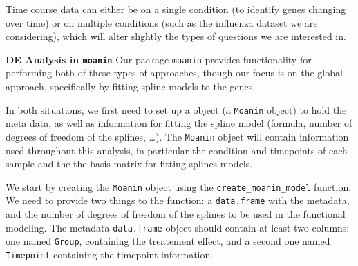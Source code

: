 \documentclass[9pt,a4paper,]{extarticle}
\begin{document}
Time course data can either be on a single condition (to identify genes
changing over time) or on multiple conditions (such as the influenza
dataset we are considering), which will alter slightly the types of questions
we are interested in.

\textbf{DE Analysis in \texttt{moanin}} Our package \texttt{moanin} provides functionality for performing both of
these types of approaches, though our focus is on the global approach, specifically by fitting spline models to the genes.

In both
situations, we first need to set up a object (a \texttt{Moanin} object) to
hold the meta data, as well as information for fitting the spline model
(formula, number of degrees of freedom of the splines, \ldots{}). The \texttt{Moanin} object
will contain information used
throughout this analysis, in particular the condition and timepoints of each sample and the
the basis matrix for fitting splines models.

We start by creating the \texttt{Moanin} object using the \texttt{create\_moanin\_model}
function. We need to provide two things to the function: a \texttt{data.frame} with
the metadata, and the number of degrees of freedom of the splines to be used in the
functional modeling. The metadata \texttt{data.frame} object should contain at least
two columns: one named \texttt{Group}, containing the treatement effect, and a
second one named \texttt{Timepoint} containing the timepoint information.
\end{document}
